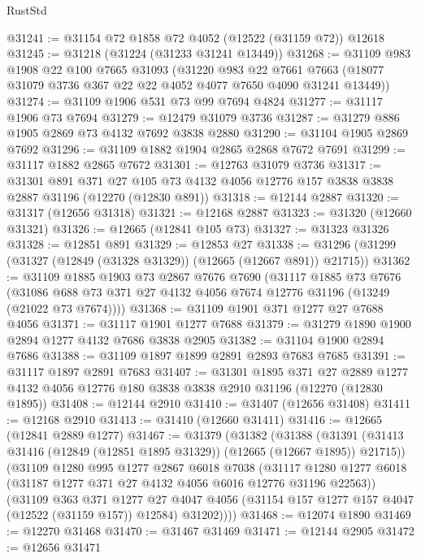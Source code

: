 \begin{lexlean}{RustStd}
\begin{coremodule}
@31241 := @31154 @72 @1858 @72 @4052 (@12522 (@31159 @72)) @12618
@31245 := @31218 (@31224 (@31233 @31241 @13449))
@31268 := @31109
    @983
    @1908
    @22
    @100
    @7665
    @31093
    (@31220
      @983
      @22
      @7661
      @7663
      (@18077 @31079 @3736 @367 @22 @22 @4052 @4077 @7650 @4090 @31241 @13449))
@31274 := @31109 @1906 @531 @73 @99 @7694 @4824
@31277 := @31117 @1906 @73 @7694
@31279 := @12479 @31079 @3736
@31287 := @31279 @886 @1905 @2869 @73 @4132 @7692 @3838 @2880
@31290 := @31104 @1905 @2869 @7692
@31296 := @31109 @1882 @1904 @2865 @2868 @7672 @7691
@31299 := @31117 @1882 @2865 @7672
@31301 := @12763 @31079 @3736
@31317 := @31301
    @891
    @371
    @27
    @105
    @73
    @4132
    @4056
    @12776
    @157
    @3838
    @3838
    @2887
    @31196
    (@12270 (@12830 @891))
@31318 := @12144 @2887
@31320 := @31317 (@12656 @31318)
@31321 := @12168 @2887
@31323 := @31320 (@12660 @31321)
@31326 := @12665 (@12841 @105 @73)
@31327 := @31323 @31326
@31328 := @12851 @891
@31329 := @12853 @27
@31338 := @31296 (@31299 (@31327 (@12849 (@31328 @31329)) (@12665 (@12667 @891)) @21715))
@31362 := @31109
    @1885
    @1903
    @73
    @2867
    @7676
    @7690
    (@31117
      @1885
      @73
      @7676
      (@31086 @688 @73 @371 @27 @4132 @4056 @7674 @12776 @31196 (@13249 (@21022 @73 @7674))))
@31368 := @31109 @1901 @371 @1277 @27 @7688 @4056
@31371 := @31117 @1901 @1277 @7688
@31379 := @31279 @1890 @1900 @2894 @1277 @4132 @7686 @3838 @2905
@31382 := @31104 @1900 @2894 @7686
@31388 := @31109 @1897 @1899 @2891 @2893 @7683 @7685
@31391 := @31117 @1897 @2891 @7683
@31407 := @31301
    @1895
    @371
    @27
    @2889
    @1277
    @4132
    @4056
    @12776
    @180
    @3838
    @3838
    @2910
    @31196
    (@12270 (@12830 @1895))
@31408 := @12144 @2910
@31410 := @31407 (@12656 @31408)
@31411 := @12168 @2910
@31413 := @31410 (@12660 @31411)
@31416 := @12665 (@12841 @2889 @1277)
@31467 := @31379
    (@31382
      (@31388
        (@31391 (@31413 @31416 (@12849 (@12851 @1895 @31329)) (@12665 (@12667 @1895)) @21715))
        (@31109
          @1280
          @995
          @1277
          @2867
          @6018
          @7038
          (@31117 @1280 @1277 @6018 (@31187 @1277 @371 @27 @4132 @4056 @6016 @12776 @31196 @22563))
          (@31109
            @363
            @371
            @1277
            @27
            @4047
            @4056
            (@31154 @157 @1277 @157 @4047 (@12522 (@31159 @157)) @12584)
            @31202))))
@31468 := @12074 @1890
@31469 := @12270 @31468
@31470 := @31467 @31469
@31471 := @12144 @2905
@31472 := @12656 @31471

\end{coremodule}
\end{lexlean}
